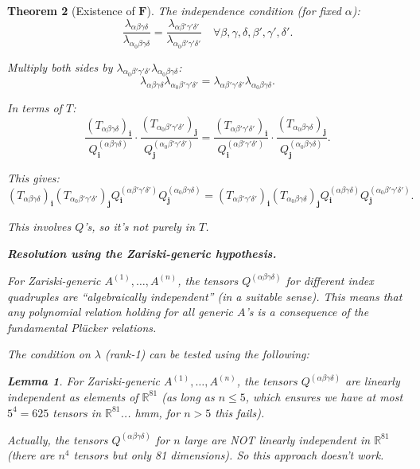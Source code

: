 \documentclass[12pt]{article}
\newtheorem{theorem}{Theorem}
\newtheorem{lemma}[theorem]{Lemma}
\begin{document}
\begin{theorem}[Existence of $\mathbf{F}$]
The independence condition (for fixed $\alpha$):
\[
\frac{\lambda_{\alpha\beta\gamma\delta}}{\lambda_{\alpha_0\beta\gamma\delta}} = \frac{\lambda_{\alpha\beta'\gamma'\delta'}}{\lambda_{\alpha_0\beta'\gamma'\delta'}} \quad \forall \beta,\gamma,\delta,\beta',\gamma',\delta'.
\]

Multiply both sides by $\lambda_{\alpha_0\beta'\gamma'\delta'}\lambda_{\alpha_0\beta\gamma\delta}$:
\[
\lambda_{\alpha\beta\gamma\delta} \lambda_{\alpha_0\beta'\gamma'\delta'} = \lambda_{\alpha\beta'\gamma'\delta'} \lambda_{\alpha_0\beta\gamma\delta}.
\]

In terms of $T$:
\[
\frac{(T_{\alpha\beta\gamma\delta})_\mathbf{i}}{Q^{(\alpha\beta\gamma\delta)}_\mathbf{i}} \cdot \frac{(T_{\alpha_0\beta'\gamma'\delta'})_\mathbf{j}}{Q^{(\alpha_0\beta'\gamma'\delta')}_\mathbf{j}} = \frac{(T_{\alpha\beta'\gamma'\delta'})_\mathbf{i}}{Q^{(\alpha\beta'\gamma'\delta')}_\mathbf{i}} \cdot \frac{(T_{\alpha_0\beta\gamma\delta})_\mathbf{j}}{Q^{(\alpha_0\beta\gamma\delta)}_\mathbf{j}}.
\]

This gives:
\[
(T_{\alpha\beta\gamma\delta})_\mathbf{i} (T_{\alpha_0\beta'\gamma'\delta'})_\mathbf{j} Q^{(\alpha\beta'\gamma'\delta')}_\mathbf{i} Q^{(\alpha_0\beta\gamma\delta)}_\mathbf{j} = (T_{\alpha\beta'\gamma'\delta'})_\mathbf{i} (T_{\alpha_0\beta\gamma\delta})_\mathbf{j} Q^{(\alpha\beta\gamma\delta)}_\mathbf{i} Q^{(\alpha_0\beta'\gamma'\delta')}_\mathbf{j}.
\]

This involves $Q$'s, so it's not purely in $T$.

\textbf{Resolution using the Zariski-generic hypothesis.}

For Zariski-generic $A^{(1)},\ldots,A^{(n)}$, the tensors $Q^{(\alpha\beta\gamma\delta)}$ for different index quadruples are ``algebraically independent'' (in a suitable sense). This means that any polynomial relation holding for all generic $A$'s is a consequence of the fundamental Plücker relations.

The condition on $\lambda$ (rank-1) can be tested using the following:

\begin{lemma}\label{lem:generic-test}
For Zariski-generic $A^{(1)},\ldots,A^{(n)}$, the tensors $Q^{(\alpha\beta\gamma\delta)}$ are linearly independent as elements of $\mathbb{R}^{81}$ (as long as $n \leq 5$, which ensures we have at most $5^4 = 625$ tensors in $\mathbb{R}^{81}$... hmm, for $n > 5$ this fails).

Actually, the tensors $Q^{(\alpha\beta\gamma\delta)}$ for $n$ large are NOT linearly independent in $\mathbb{R}^{81}$ (there are $n^4$ tensors but only 81 dimensions). So this approach doesn't work.
\end{lemma}


\end{theorem}
\end{document}
